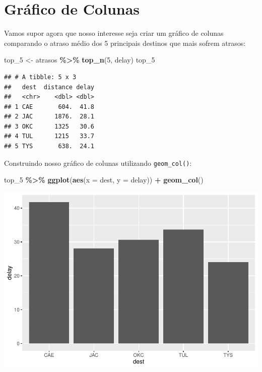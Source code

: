 \documentclass[
]{book}
\newenvironment{Shaded}{\begin{snugshade}}{\end{snugshade}}
\newcommand{\AttributeTok}[1]{\textcolor[rgb]{0.13,0.29,0.53}{#1}}
\newcommand{\DecValTok}[1]{\textcolor[rgb]{0.00,0.00,0.81}{#1}}
\newcommand{\FunctionTok}[1]{\textcolor[rgb]{0.13,0.29,0.53}{\textbf{#1}}}
\newcommand{\NormalTok}[1]{#1}
\newcommand{\OtherTok}[1]{\textcolor[rgb]{0.56,0.35,0.01}{#1}}
\newcommand{\SpecialCharTok}[1]{\textcolor[rgb]{0.81,0.36,0.00}{\textbf{#1}}}
\begin{document}
\section{Gráfico de Colunas}\label{gruxe1fico-de-colunas}

Vamos supor agora que nosso interesse seja criar um gráfico de colunas comparando o atraso médio dos 5 principais destinos que mais sofrem atrasos:

\begin{Shaded}
\begin{Highlighting}[]
\NormalTok{top\_5 }\OtherTok{\textless{}{-}}\NormalTok{ atrasos }\SpecialCharTok{\%\textgreater{}\%} \FunctionTok{top\_n}\NormalTok{(}\DecValTok{5}\NormalTok{, delay)}
\NormalTok{top\_5}
\end{Highlighting}
\end{Shaded}

\begin{verbatim}
## # A tibble: 5 x 3
##   dest  distance delay
##   <chr>    <dbl> <dbl>
## 1 CAE       604.  41.8
## 2 JAC      1876.  28.1
## 3 OKC      1325   30.6
## 4 TUL      1215   33.7
## 5 TYS       638.  24.1
\end{verbatim}

Construindo nosso gráfico de colunas utilizando \texttt{geom\_col()}:

\begin{Shaded}
\begin{Highlighting}[]
\NormalTok{top\_5 }\SpecialCharTok{\%\textgreater{}\%} 
  \FunctionTok{ggplot}\NormalTok{(}\FunctionTok{aes}\NormalTok{(}\AttributeTok{x =}\NormalTok{ dest, }\AttributeTok{y =}\NormalTok{ delay)) }\SpecialCharTok{+}
  \FunctionTok{geom\_col}\NormalTok{()}
\end{Highlighting}
\end{Shaded}

\includegraphics{AprendendoR_files/figure-latex/unnamed-chunk-65-1.pdf}
\end{document}
